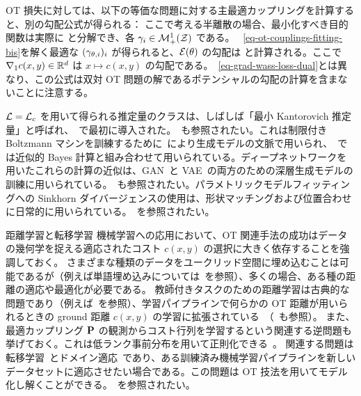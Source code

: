 OT 損失に対しては、以下の等価な問題に対する主最適カップリングを計算すると、別の勾配公式が得られる：
ここで考える半離散の場合、最小化すべき目的関数は実際に
と分解でき、各 $\ga_i \in \Mm_+^1(\Zz)$ である。
~\eqref{eq-ot-couplings-fitting-bis}を解く最適な $(\gamma_{\th,i})_i$ が得られると、$\Ee(\th)$ の勾配は
と計算される。ここで $\nabla_1 c(x,y) \in \RR^\dim$ は $x \mapsto c(x,y)$ の勾配である。~\eqref{eq-grad-wass-loss-dual}とは異なり、この公式は双対 OT 問題の解であるポテンシャルの勾配の計算を含まないことに注意する。

$\Ll=\MK_\c$ を用いて得られる推定量のクラスは、しばしば「最小 Kantorovich 推定量」と呼ばれ、~\citep{bassetti2006minimum}で最初に導入された。~\citep{CanasRosasco}も参照されたい。これは制限付き Boltzmann マシンを訓練するために~\citep{CuturiBoltzman}により生成モデルの文脈で用いられ、~\citep{bernton2017inference}では近似的 Bayes 計算と組み合わせて用いられている。ディープネットワークを用いたこれらの計算の近似は、GAN~\citep{WassersteinGAN}と VAE~\citep{Bousquet2017}の両方のための深層生成モデルの訓練に用いられている。~\citep{2017-Genevay-AutoDiff,2017-Genevay-gan-vae,salimans2018improving}も参照されたい。パラメトリックモデルフィッティングへの Sinkhorn ダイバージェンスの使用は、形状マッチングおよび位置合わせに日常的に用いられている。~\citep{gold1998new,chui2000new,myronenko2010point,2017-feydy-miccai}を参照されたい。


\begin{rem1}{距離学習と転移学習}
	機械学習への応用において、OT 関連手法の成功はデータの幾何学を捉える適応されたコスト $c(x,y)$ の選択に大きく依存することを強調しておく。
	さまざまな種類のデータをユークリッド空間に埋め込むことは可能であるが（例えば単語埋め込みについては~\citep{mikolov2013efficient}を参照）、多くの場合、ある種の距離の適応や最適化が必要である。
	教師付きタスクのための距離学習は古典的な問題であり（例えば~\citep{MAL-019,weinberger2009distance}を参照）、学習パイプラインで何らかの OT 距離が用いられるときの ground 距離 $c(x,y)$ の学習に拡張されている~\citep{CuturiGroundMetric2014}（~\citealt{ZenICPR14,WangECCV12OLD,huang2016supervised}も参照）。
	また、最適カップリング $\P$ の観測からコスト行列を学習するという関連する逆問題も挙げておく。これは低ランク事前分布を用いて正則化できる~\citep{dupuy2016estimating}。
	関連する問題は転移学習~\citep{pan2010survey}とドメイン適応~\citep{glorot2011domain}であり、ある訓練済み機械学習パイプラインを新しいデータセットに適応させたい場合である。この問題は OT 技法を用いてモデル化し解くことができる。~\citep{courty2017optimal,courty2017joint}を参照されたい。
\end{rem1}
